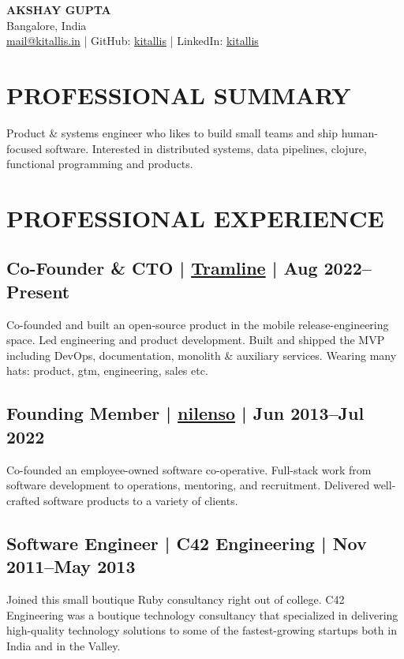 \documentclass[11pt,a4paper]{article}
\newcommand{\company}[2]{%
  \href{#2}{\mbox{#1}}%
}
\begin{document}
\begin{center}
    {\Huge \textbf{AKSHAY GUPTA}}\\[0.3cm]
    Bangalore, India\\
    \href{mailto:mail@kitallis.in}{mail@kitallis.in} |
    GitHub: \href{https://github.com/kitallis}{kitallis} |
    LinkedIn: \href{https://linkedin.com/in/kitallis}{kitallis}
\end{center}

\section*{PROFESSIONAL SUMMARY}
Product \& systems engineer who likes to build small teams and ship human-focused software. Interested in distributed systems, data pipelines, clojure, functional programming and products.

\section*{PROFESSIONAL EXPERIENCE}

\subsection*{Co-Founder \& CTO | \company{Tramline}{https://tramline.app} | Aug 2022--Present}
Co-founded and built an open-source product in the mobile release-engineering space. Led engineering and product development. Built and shipped the MVP including DevOps, documentation, monolith \& auxiliary services. Wearing many hats: product, gtm, engineering, sales etc.

\subsection*{Founding Member | \company{nilenso}{https://nilenso.com} | Jun 2013--Jul 2022}
Co-founded an employee-owned software co-operative. Full-stack work from software development to operations, mentoring, and recruitment. Delivered well-crafted software products to a variety of clients.

\subsection*{Software Engineer | C42 Engineering | Nov 2011--May 2013}
Joined this small boutique Ruby consultancy right out of college. C42 Engineering was a boutique technology consultancy that specialized in delivering high-quality technology solutions to some of the fastest-growing startups both in India and in the Valley.
\end{document}

